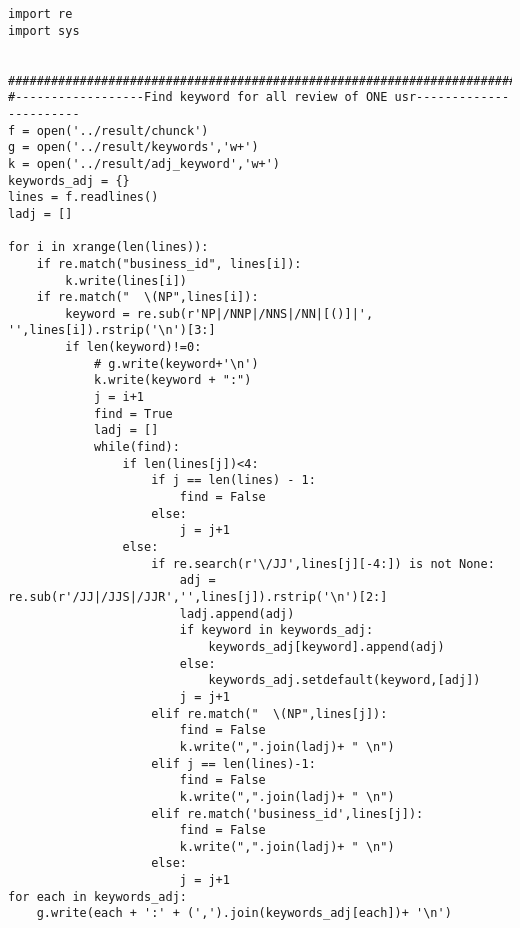 \documentclass[11pt,letterpaper]{article}
\begin{document}
\clearpage
\lstset{language=Python,basicstyle=\footnotesize}
\begin{lstlisting}
import re
import sys


################################################################################
#------------------Find keyword for all review of ONE usr-----------------------
f = open('../result/chunck')
g = open('../result/keywords','w+')
k = open('../result/adj_keyword','w+')
keywords_adj = {}
lines = f.readlines()
ladj = []

for i in xrange(len(lines)):
	if re.match("business_id", lines[i]):
		k.write(lines[i])
	if re.match("  \(NP",lines[i]):
		keyword = re.sub(r'NP|/NNP|/NNS|/NN|[()]|', '',lines[i]).rstrip('\n')[3:]
		if len(keyword)!=0:
			# g.write(keyword+'\n')
			k.write(keyword + ":")
			j = i+1
			find = True
			ladj = []
			while(find):
				if len(lines[j])<4:
					if j == len(lines) - 1:
						find = False
					else:
						j = j+1
				else:
					if re.search(r'\/JJ',lines[j][-4:]) is not None:
						adj = re.sub(r'/JJ|/JJS|/JJR','',lines[j]).rstrip('\n')[2:]
						ladj.append(adj)
						if keyword in keywords_adj:
							keywords_adj[keyword].append(adj)
						else:
							keywords_adj.setdefault(keyword,[adj])
						j = j+1
					elif re.match("  \(NP",lines[j]):
						find = False
						k.write(",".join(ladj)+ " \n")
					elif j == len(lines)-1:
						find = False
						k.write(",".join(ladj)+ " \n")
					elif re.match('business_id',lines[j]):
						find = False
						k.write(",".join(ladj)+ " \n")
					else:
						j = j+1
for each in keywords_adj:
	g.write(each + ':' + (',').join(keywords_adj[each])+ '\n')
\end{lstlisting}
\end{document}
